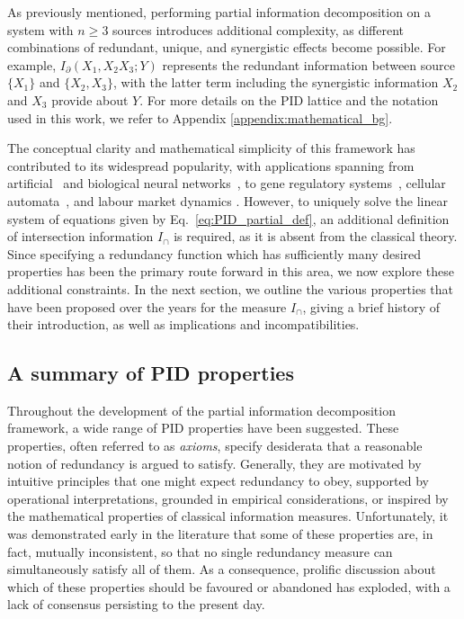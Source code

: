 \documentclass{article}
\newcommand{\Ic}{\ensuremath{I_\cap}\xspace}
\begin{document}
As previously mentioned, performing partial information decomposition on a system with $n\ge3$ sources introduces additional complexity, as different combinations of redundant, unique, and synergistic effects become possible. For example, $I_\partial(X_1,X_2X_3;Y)$ represents the redundant information between source $\{X_1\}$ and $\{X_2,X_3\}$, with the latter term including the synergistic information $X_2$ and $X_3$ provide about $Y$. For more details on the PID lattice and the notation used in this work, we refer to Appendix \ref{appendix:mathematical_bg}.

The conceptual clarity and mathematical simplicity of this framework has contributed to its widespread popularity, with applications spanning from artificial~\cite{beer2015information, wibral2017partial, ince2017measuring, tax2017partial, proca2024synergistic} and biological neural networks~\cite{luppi2020synergisticCore, varley2023partial, varley2023multivariate, luppi2024information, gatica2021high, gatica2022high, combrisson2025higher, coronel2025integrated, santoro2025beyond}, to gene regulatory systems~\cite{chan2017gene, chen2018evaluating}, cellular automata~\cite{finn2018quantifying, rosas2018information}, and labour market dynamics \cite{rajpal2025synergistic}. 
However, to uniquely solve the linear system of equations given by Eq.~\eqref{eq:PID_partial_def}, an additional definition of intersection information $\Ic$ is required, as it is absent from the classical theory. Since specifying a redundancy function which has sufficiently many desired properties has been the primary route forward in this area, we now explore these additional constraints. In the next section, we outline the various properties that have been proposed over the years for the measure $I_\cap$, giving a brief history of their introduction, as well as implications and incompatibilities. 

\subsection{A summary of PID properties} \label{sec:properties}


Throughout the development of the partial information decomposition framework, a wide range of PID properties have been suggested. These properties, often referred to as \textit{axioms}, specify desiderata that a reasonable notion of redundancy is argued to satisfy. Generally, they are motivated by intuitive principles that one might expect redundancy to obey, supported by operational interpretations, grounded in empirical considerations, or inspired by the mathematical properties of classical information measures.
Unfortunately, it was demonstrated early in the literature that some of these properties are, in fact, mutually inconsistent, so that no single redundancy measure can simultaneously satisfy all of them. As a consequence, prolific discussion about which of these properties should be favoured or abandoned has exploded, with a lack of consensus persisting to the present day.
\end{document}

